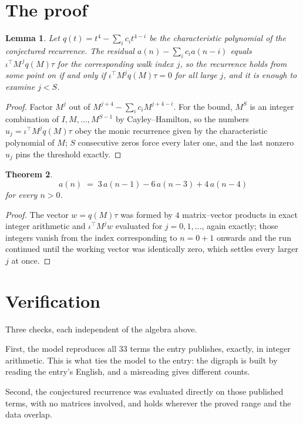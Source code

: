 \documentclass[11pt,a4paper]{article}
\theoremstyle{plain}
\newtheorem{theorem}{Theorem}
\newtheorem{lemma}[theorem]{Lemma}
\theoremstyle{definition}
\begin{document}
\section{The proof}

\begin{lemma}\label{lem:crit}
Let $q(t)=t^{4}-\sum_i c_it^{4-i}$ be the characteristic polynomial of the
conjectured recurrence. The residual $a(n)-\sum_ic_ia(n-i)$ equals
$\iota^{\!\top}M^{\,j}q(M)\tau$ for the corresponding walk index $j$, so the recurrence
holds from some point on if and only if $\iota^{\!\top}M^{j}q(M)\tau=0$ for all large $j$,
and it is enough to examine $j<S$.
\end{lemma}

\begin{proof}
Factor $M^{j}$ out of $M^{j+4}-\sum_ic_iM^{j+4-i}$. For the bound, $M^{S}$
is an integer combination of $I,M,\dots,M^{S-1}$ by Cayley--Hamilton, so the numbers
$u_j=\iota^{\!\top}M^{j}q(M)\tau$ obey the monic recurrence given by the characteristic
polynomial of $M$; $S$ consecutive zeros force every later one, and the last nonzero $u_j$
pins the threshold exactly.
\end{proof}

\begin{theorem}
\[
a(n)\;=\;3\,a(n-1) - 6\,a(n-3) + 4\,a(n-4)
\]
for every $n>0$.
\end{theorem}

\begin{proof}
The vector $w=q(M)\tau$ was formed by $4$ matrix--vector products in exact integer
arithmetic and $\iota^{\!\top}M^{j}w$ evaluated for $j=0,1,\dots$, again exactly; those
integers vanish from the index corresponding to $n=0+1$ onwards and the run continued
until the working vector was identically zero, which settles every larger $j$ at once.
\end{proof}

\section{Verification}

Three checks, each independent of the algebra above.

First, the model reproduces all $33$ terms the entry publishes, exactly, in integer
arithmetic. This is what ties the model to the entry: the digraph is built by reading the
entry's English, and a misreading gives different counts.

Second, the conjectured recurrence was evaluated directly on those published terms, with no
matrices involved, and holds wherever the proved range and the data overlap.
\end{document}
